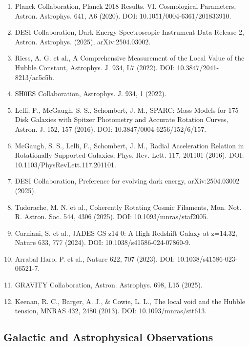 \documentclass[12pt,oneside]{book}
\begin{document}
\begin{enumerate}
    \item Planck Collaboration, Planck 2018 Results. VI. Cosmological Parameters, Astron. Astrophys. 641, A6 (2020). DOI: 10.1051/0004-6361/201833910.
    \item DESI Collaboration, Dark Energy Spectroscopic Instrument Data Release 2, Astron. Astrophys. (2025), arXiv:2504.03002.
    \item Riess, A. G. et al., A Comprehensive Measurement of the Local Value of the Hubble Constant, Astrophys. J. 934, L7 (2022). DOI: 10.3847/2041-8213/ac5c5b.
    \item SH0ES Collaboration, Astrophys. J. 934, 1 (2022).
    \item Lelli, F., McGaugh, S. S., Schombert, J. M., SPARC: Mass Models for 175 Disk Galaxies with Spitzer Photometry and Accurate Rotation Curves, Astron. J. 152, 157 (2016). DOI: 10.3847/0004-6256/152/6/157.
    \item McGaugh, S. S., Lelli, F., Schombert, J. M., Radial Acceleration Relation in Rotationally Supported Galaxies, Phys. Rev. Lett. 117, 201101 (2016). DOI: 10.1103/PhysRevLett.117.201101.
    \item DESI Collaboration, Preference for evolving dark energy, arXiv:2504.03002 (2025).
    \item Tudorache, M. N. et al., Coherently Rotating Cosmic Filaments, Mon. Not. R. Astron. Soc. 544, 4306 (2025). DOI: 10.1093/mnras/staf2005.
    \item Carniani, S. et al., JADES-GS-z14-0: A High-Redshift Galaxy at z=14.32, Nature 633, 777 (2024). DOI: 10.1038/s41586-024-07860-9.
    \item Arrabal Haro, P. et al., Nature 622, 707 (2023). DOI: 10.1038/s41586-023-06521-7.
    \item GRAVITY Collaboration, Astron. Astrophys. 698, L15 (2025).
    \item Keenan, R. C., Barger, A. J., \& Cowie, L. L., The local void and the Hubble tension, MNRAS 432, 2480 (2013). DOI: 10.1093/mnras/stt613.
\end{enumerate}

\subsection{Galactic and Astrophysical Observations}
\end{document}
